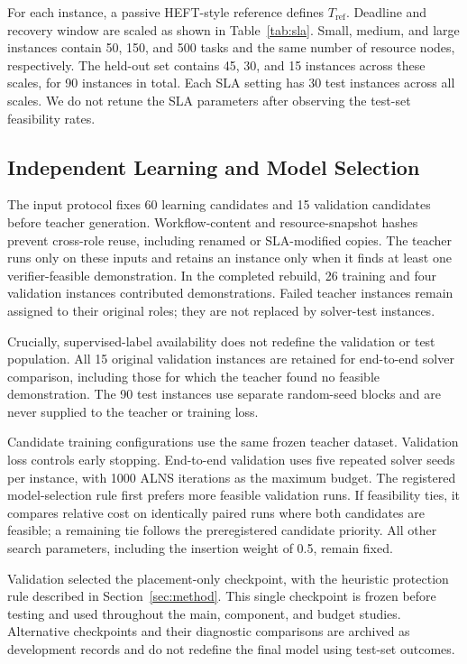 For each instance, a passive HEFT-style reference defines
$T_{\mathrm{ref}}$. Deadline and recovery window are scaled as shown in
Table~\ref{tab:sla}. Small, medium, and large instances contain 50, 150, and
500 tasks and the same number of resource nodes, respectively. The held-out
set contains 45, 30, and 15 instances across these scales, for 90 instances
in total. Each SLA setting has 30 test instances across all scales. We do not
retune the SLA parameters after observing the test-set feasibility rates.

\subsection{Independent Learning and Model Selection}
The input protocol fixes 60 learning candidates and 15 validation candidates
before teacher generation. Workflow-content and resource-snapshot hashes
prevent cross-role reuse, including renamed or SLA-modified copies. The
teacher runs only on these inputs and retains an instance only when it finds
at least one verifier-feasible demonstration. In the completed rebuild, 26
training and four validation instances contributed demonstrations. Failed
teacher instances remain assigned to their original roles; they are not
replaced by solver-test instances.

Crucially, supervised-label availability does not redefine the validation or
test population. All 15 original validation instances are retained for
end-to-end solver comparison, including those for which the teacher found
no feasible demonstration. The 90 test instances use separate random-seed
blocks and are never supplied to the teacher or training loss.

Candidate training configurations use the same frozen teacher dataset.
Validation loss controls early stopping.
End-to-end validation uses five repeated solver seeds per instance, with
1000 ALNS iterations as the maximum budget. The registered model-selection
rule first prefers more feasible validation runs. If feasibility ties, it
compares relative cost on identically paired runs where both candidates are
feasible; a remaining tie follows the preregistered candidate priority.
All other search
parameters, including the insertion weight of 0.5, remain fixed.

Validation selected the placement-only checkpoint, with the heuristic
protection rule described in Section~\ref{sec:method}. This single checkpoint
is frozen before testing and used throughout the main, component, and budget
studies. Alternative checkpoints and their diagnostic comparisons are
archived as development records and do not redefine the final model using
test-set outcomes.

